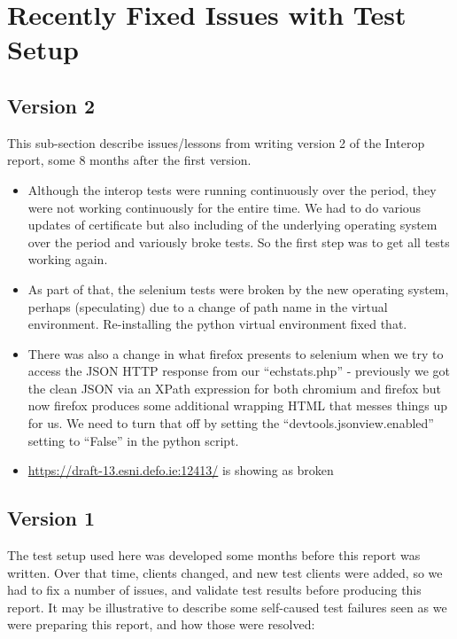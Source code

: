 \section{Recently Fixed Issues with Test Setup}
\label{app:alongtheway}

\subsection{Version 2}

This sub-section describe issues/lessons from writing version 2 of
the Interop report, some 8 months after the first version.

\begin{itemize}

\item Although the interop tests were running continuously over the period,
    they were not working continuously for the entire time. We had to do
        various updates of certificate but also including of the underlying
        operating system over the period and variously broke tests. So the
        first step was to get all tests working again.

\item As part of that, the selenium tests were broken by the new operating
    system, perhaps (speculating) due to a change of path name in the virtual
        environment. Re-installing the python virtual environment fixed that.

\item There was also a change in what firefox presents to selenium when we
    try to access the JSON HTTP response from our ``echstats.php'' -
        previously we got the clean JSON via an XPath
        expression for both chromium and firefox but now firefox produces
        some additional wrapping HTML that messes things up for us. We need
        to turn that off by setting the ``devtools.jsonview.enabled'' setting
        to ``False'' in the python script.

\item \url{https://draft-13.esni.defo.ie:12413/} is showing as broken

\end{itemize}

\subsection{Version 1}

The test setup used here was developed some months before this report was
written.  Over that time, clients changed, and new test clients were added, so
we had to fix a number of issues, and validate test results before producing
this report. It may be illustrative to describe some self-caused test failures
seen as we were preparing this report, and how those were resolved:

